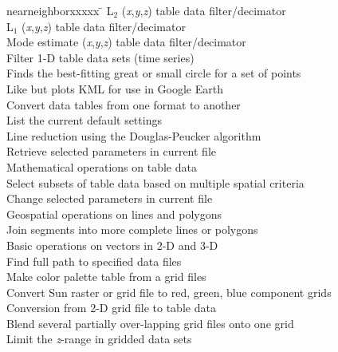 \begin{tabbing}
nearneighborxxxxx \=					\kill
{}	\>	L$_2$ (\emph{x},\emph{y},\emph{z}) table data filter/decimator \\ 
	\>	L$_1$ (\emph{x},\emph{y},\emph{z}) table data filter/decimator \\ 
	\>	Mode estimate (\emph{x},\emph{y},\emph{z}) table data filter/decimator \\ 
	\>	Filter 1-D table data sets (time series) \\ 
	\>	Finds the best-fitting great or small circle for a set of points \\ 
	\>	Like  but plots KML for use in Google Earth \\ 
	\>	Convert data tables from one format to another \\ 
	\>	List the current default settings \\ 
		\>	Line reduction using the Douglas-Peucker algorithm \\ 
	\>	Retrieve selected parameters in current  file \\ 
	\>	Mathematical operations on table data \\ 
	\>	Select subsets of table data based on multiple spatial criteria \\ 
	\>	Change selected parameters in current  file \\ 
	\>	Geospatial operations on lines and polygons \\
	\>	Join segments into more complete lines or polygons \\ 
	\>	Basic operations on vectors in 2-D and 3-D \\ 
	\>	Find full path to specified data files \\ 
	\>	Make color palette table from a grid files \\ 
	\>	Convert Sun raster or grid file to red, green, blue component grids \\ 
	\>	Conversion from 2-D grid file to table data \\ 
	\>	Blend several partially over-lapping grid files onto one grid \\ 
	\>	Limit the \emph{z}-range in gridded data sets \\ 

\end{tabbing}
